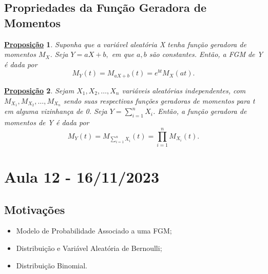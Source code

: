 \documentclass{article}
\newtheorem*{prop*}{\underline{Proposi\c c\~ao}}
\begin{document}
\subsection{Propriedades da Função Geradora de Momentos}
\begin{prop*}
  Suponha que a variável aleatória X tenha função geradora de momentos \(M_{X}\). Seja \(Y = aX + b,\) em que \(a, b\) são constantes.
  Então, a FGM de Y é dada por 
  \[
    M_{Y}(t) = M_{aX + b}(t) = e^{bt}M_{X}(at).
  \]
\end{prop*}
\begin{prop*}
  Sejam \(X_{1}, X_{2}, \dotsc, X_{n}\) variáveis aleatórias independentes, com 
  \(M_{X_{1}}, M_{X_{2}}, \dotsc, M_{X_{n}}\) sendo suas respectivas funções geradoras de momentos para t em alguma vizinhança de 0.
  Seja  \(Y = \sum\limits_{i=1}^{n}X_{i}\). Então, a função geradora de momentos de Y é dada por 
  \[
    M_{Y}(t) = M_{\sum\limits_{i=1}^{n}X_{i}}(t) = \prod\limits_{i=1}^{n}M_{X_{i}}(t).
  \]
\end{prop*} 
\newpage

\section{Aula 12 - 16/11/2023}
\subsection{Motivações}
\begin{itemize}
  \item Modelo de Probabilidade Associado a uma FGM;
  \item Distribuição e Variável Aleatória de Bernoulli;
  \item Distribuição Binomial.
\end{itemize}
\end{document}

